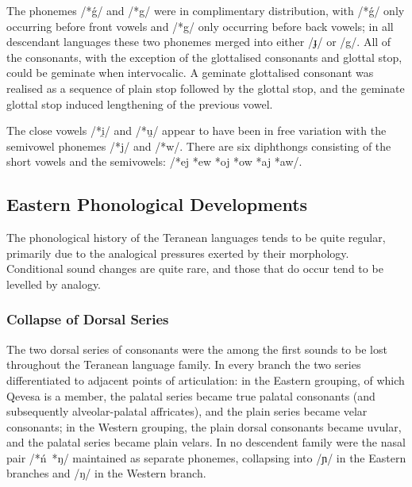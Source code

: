 \documentclass[grammar]{subfiles}
\begin{document}
The phonemes /*ǵ/ and /*g/ were in complimentary distribution, with /*ǵ/ only
occurring before front vowels and /*g/ only occurring before back vowels; in
all descendant languages these two phonemes merged into either /ɟ/ or /g/.  All
of the consonants, with the exception of the glottalised consonants and glottal
stop, could be geminate when intervocalic.  A geminate glottalised consonant
was realised as a sequence of plain stop followed by the glottal stop, and the
geminate glottal stop induced lengthening of the previous vowel.

The close vowels /*i̯/ and /*u̯/ appear to have been in free variation with the
semivowel phonemes /*j/ and /*w/.  There are six diphthongs consisting of the
short vowels and the semivowels: /*ej *ew *oj *ow *aj *aw/.

%

\subsection{Eastern Phonological Developments}
\label{ssec:history:eastern_developments}

The phonological history of the Teranean languages tends to be quite regular,
primarily due to the analogical pressures exerted by their morphology.
Conditional sound changes are quite rare, and those that do occur tend to be
levelled by analogy.

\subsubsection{Collapse of Dorsal Series}
\label{sssec:history:east:dorsal_consonants}

The two dorsal series of consonants were the among the first sounds to be lost
throughout the Teranean language family.  In every branch the two series
differentiated to adjacent points of articulation: in the Eastern grouping, of
which Qevesa is a member, the palatal series became true palatal consonants
(and subsequently alveolar-palatal affricates), and the plain series became
velar consonants; in the Western grouping, the plain dorsal consonants became
uvular, and the palatal series became plain velars.  In no descendent family
were the nasal pair /*ń~*ŋ/ maintained as separate phonemes, collapsing into
/ɲ/ in the Eastern branches and /ŋ/ in the Western branch.
\end{document}
